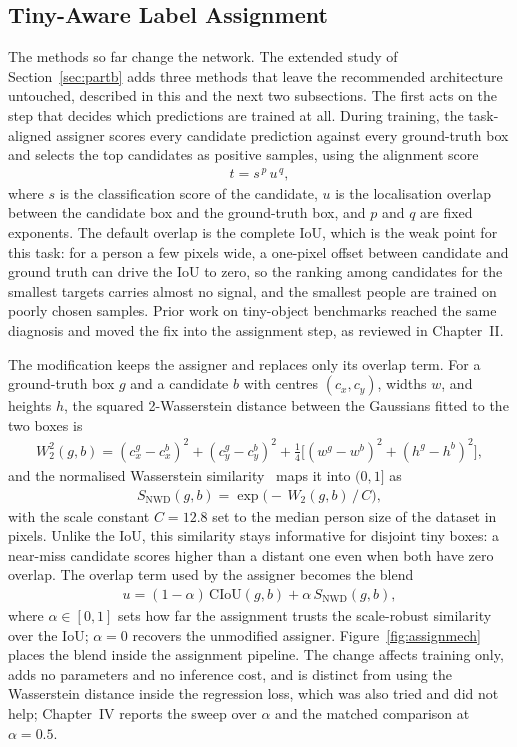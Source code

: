 \subsection{Tiny-Aware Label Assignment}
\label{sec:assignmethod}
The methods so far change the network. The extended study of
Section~\ref{sec:partb} adds three methods that leave the recommended
architecture untouched, described in this and the next two subsections. The
first acts on the step that decides which predictions are trained at all. During
training, the task-aligned assigner scores every candidate prediction against
every ground-truth box and selects the top candidates as positive samples, using
the alignment score
\begin{align}
  t = s^{\,p} \, u^{\,q},
\end{align}
where $s$ is the classification score of the candidate, $u$ is the localisation
overlap between the candidate box and the ground-truth box, and $p$ and $q$ are
fixed exponents. The default overlap is the complete IoU, which is the weak
point for this task: for a person a few pixels wide, a one-pixel offset between
candidate and ground truth can drive the IoU to zero, so the ranking among
candidates for the smallest targets carries almost no signal, and the smallest
people are trained on poorly chosen samples. Prior work on tiny-object
benchmarks reached the same diagnosis and moved the fix into the assignment
step, as reviewed in Chapter~II.

The modification keeps the assigner and replaces only its overlap term. For a
ground-truth box $g$ and a candidate $b$ with centres $(c_x, c_y)$, widths $w$,
and heights $h$, the squared 2-Wasserstein distance between the Gaussians fitted
to the two boxes is
\begin{align}
  W_2^2(g,b) = (c_{x}^{g}-c_{x}^{b})^2 + (c_{y}^{g}-c_{y}^{b})^2
             + \tfrac{1}{4}\big[(w^{g}-w^{b})^2 + (h^{g}-h^{b})^2\big],
\end{align}
and the normalised Wasserstein similarity~\cite{wang2021nwd} maps it into
$(0,1]$ as
\begin{align}
  S_{\mathrm{NWD}}(g,b) = \exp\!\big(-\,W_2(g,b)\,/\,C\big),
\end{align}
with the scale constant $C=12.8$ set to the median person size of the dataset in
pixels. Unlike the IoU, this similarity stays informative for disjoint tiny
boxes: a near-miss candidate scores higher than a distant one even when both
have zero overlap. The overlap term used by the assigner becomes the blend
\begin{align}
  u = (1-\alpha)\,\mathrm{CIoU}(g,b) + \alpha\, S_{\mathrm{NWD}}(g,b),
  \label{eq:blend}
\end{align}
where $\alpha \in [0,1]$ sets how far the assignment trusts the scale-robust
similarity over the IoU; $\alpha=0$ recovers the unmodified assigner.
Figure~\ref{fig:assignmech} places the blend inside the assignment pipeline. The
change affects training only, adds no parameters and no inference cost, and is
distinct from using the Wasserstein distance inside the regression loss, which
was also tried and did not help; Chapter~IV reports the sweep over $\alpha$ and
the matched comparison at $\alpha=0.5$.

